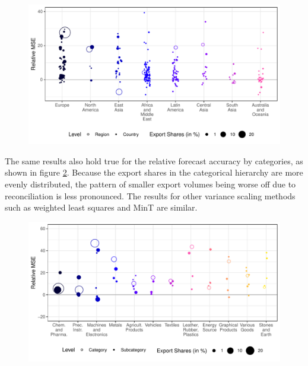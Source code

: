 \documentclass[a4paper,fleqn,11pt]{article}
\begin{document}
\begin{figure}[H]
	\includegraphics[width=\textwidth]{fig/fig_eval_regions}
	\label{fig:eval_regions}
\end{figure}

The same results also hold true for the relative forecast accuracy by categories, as shown in figure \ref{fig:eval_categories}. Because the export shares in the categorical hierarchy are more evenly distributed, the pattern of smaller export volumes being worse off due to reconciliation is less pronounced. The results for other variance scaling methods such as weighted least squares and MinT are similar.

\begin{figure}[H]
	\includegraphics[width=\textwidth]{fig/fig_eval_categories}
	\label{fig:eval_categories}
\end{figure}
\end{document}
